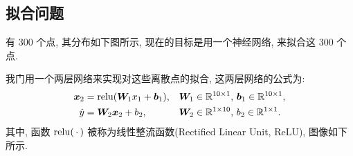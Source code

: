 \subsection{拟合问题}
\begin{frame}{\insertsection}{\insertsubsection}
\begin{minipage}[t]{0.41\textwidth}
有 300 个点, 其分布如下图所示, 现在的目标是用一个神经网络, 来拟合这 300 个点.

\begin{center}
\hspace{-10pt}%
\end{center}
\end{minipage}%
\hfill%
\begin{minipage}[t]{0.55\textwidth}
我门用一个两层网络来实现对这些离散点的拟合, 这两层网络的公式为:%
%
\begin{align*}
\bm{x}_2 &= \operatorname{relu}(\bm{W}_1x_1 + \bm{b}_1)\text{,} && \text{$\bm{W}_1\in\mathbb{R}^{10\times1}$, $\bm{b}_1\in\mathbb{R}^{10\times1}$,}\\
\hat{y} &= \bm{W}_2\bm{x}_2 + b_2\text{,}  && \text{$\bm{W}_2\in\mathbb{R}^{1\times10}$, $b_2\in\mathbb{R}^{1\times1}$.}
\end{align*}%
其中, 函数 $\operatorname{relu}(\,\cdot\,)$ 被称为线性整流函数(Rectified Linear Unit, ReLU), 图像如下所示.\vspace{-2pt}

\begin{center}
\hspace{-10pt}%
\end{center}
\end{minipage}
\end{frame}

